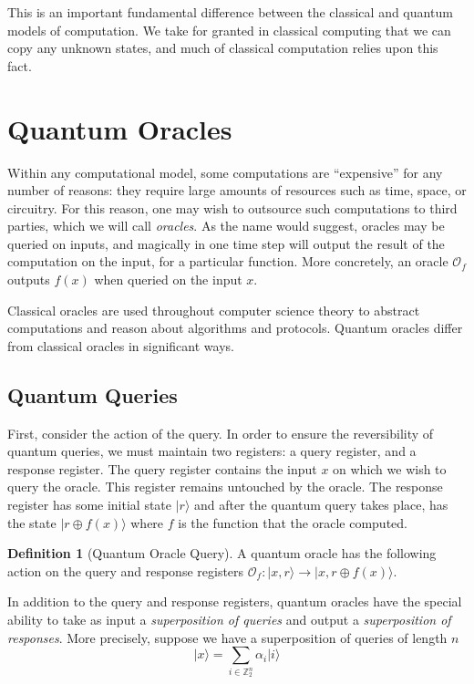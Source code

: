 \documentclass[12pt,twoside]{reedthesis}
\theoremstyle{definition}
\newtheorem{definition}[theorem]{Definition}
\newcommand{\Z}{\mathbb{Z}}
\newcommand{\ket}[1]{\ensuremath{\lvert #1\rangle}\xspace}
\begin{document}
This is an important fundamental difference between the classical and quantum models of computation. We take for granted in classical computing that we can copy any unknown states, and much of classical computation relies upon this fact. 

\section{Quantum Oracles}

Within any computational model, some computations are ``expensive'' for any number of reasons: they require large amounts of resources such as time, space, or circuitry. For this reason, one may wish to outsource such computations to third parties, which we will call \textit{oracles}. As the name would suggest, oracles may be queried on inputs, and magically in one time step will output the result of the computation on the input, for a particular function. More concretely, an oracle $\mathcal{O}_f$ outputs $f(x)$ when queried on the input $x$.

Classical oracles are used throughout computer science theory to abstract computations and reason about algorithms and protocols. Quantum oracles differ  from classical oracles in significant ways. 

\subsection{Quantum Queries}
First, consider the action of the query. In order to ensure the reversibility of quantum queries, we must maintain two registers: a query register, and a response register. The query register contains the input $x$ on which we wish to query the oracle. This register remains untouched by the oracle. The response register has some initial state $\ket{r}$ and after the quantum query takes place, has the state $\ket{r\oplus f(x)}$ where $f$ is the function that the oracle computed. 

\begin{definition}[Quantum Oracle Query] A quantum oracle has the following action on the query and response registers $\mathcal{O}_f : \ket{x, r} \rightarrow \ket{x, r \oplus f(x)}$.
\end{definition}

In addition to the query and response registers, quantum oracles have the special ability to take as input a \textit{superposition of queries} and output a \textit{superposition of responses}. More precisely, suppose we have a superposition of queries of length $n$ 
\begin{equation*}
\ket{x} = \sum_{i \in \Z_2^n} \alpha_i \ket{i}
\end{equation*}
\end{document}
